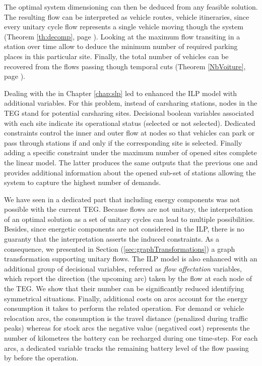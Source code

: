 The optimal system dimensioning can then be deduced from any feasible solution.
The resulting flow can be interpreted as vehicle routes, \ie vehicle itineraries, since every unitary cycle flow represents a single vehicle moving though the system (\see Theorem \ref{th:decomp}, page \pageref{th:decomp}).
Looking at the maximum flow transiting in a station over time allow to deduce the minimum number of required parking places in this particular site.
Finally, the total number of vehicles can be recovered from the flows passing though temporal cuts (\see Theorem \ref{NbVoiture}, page \pageref{NbVoiture}).

\medskip
Dealing with the {\SLP} in Chapter \ref{chap:slp} led to enhanced the ILP model with additional variables.
For this problem, instead of carsharing stations, nodes in the TEG stand for potential carsharing sites.
Decisional boolean variables associated with each site indicate its operational status (selected or not selected).
Dedicated constraints control the inner and outer flow at nodes so that vehicles can park or pass through stations if and only if the corresponding site is selected.
Finally adding a specific constraint under the maximum number of opened sites complete the linear model. 
The latter produces the same outputs that the previous one and  provides additional information about the opened sub-set of stations allowing the system to capture the highest number of demands.

\medskip
We have seen in a dedicated part that including energy components was not possible with the current TEG.
Because flows are not unitary, the interpretation of an optimal solution as a set of unitary cycles can lead to multiple possibilities.
Besides, since energetic components are not considered in the ILP, there is no guaranty that the interpretation asserts the induced constraints.
As a consequence, we presented in Section (\ref{sec:graphTransformations}) a graph transformation supporting unitary flows.
The ILP model is also enhanced with an additional group of decisional variables, referred as \emph{flow affectation} variables, which report the direction (\ie the upcoming arc) taken by the flow at each node of the TEG.
We show that their number can be significantly reduced identifying symmetrical situations.
Finally, additional costs on arcs account for the energy consumption it takes to perform the related operation.
For demand or vehicle relocation arcs, the consumption is the travel distance (penalized during traffic peaks) whereas for stock arcs the negative value (negatived cost) represents the number of kilometres the battery can be recharged during one time-step.
For each arcs, a dedicated variable tracks the remaining battery level of the flow passing by before the operation.

